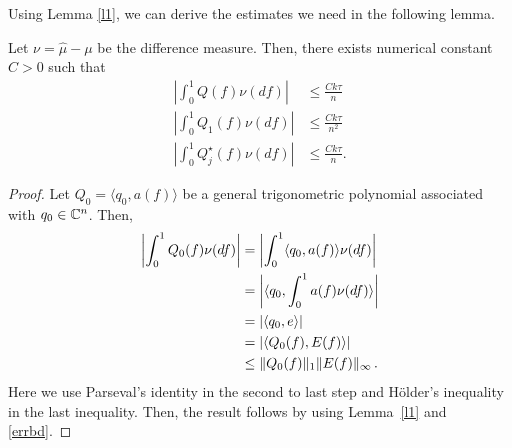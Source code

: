 Using Lemma \ref{l1}, we can derive the estimates we need in the following lemma.
\begin{lemma}
\label{l4}
Let $\nu = \hat{\mu} - \mu$ be the difference measure. Then, there exists numerical constant $C>0$ such that
\begin{align}
\label{qv}\left| \int_0^1 Q(f) \nu(df) \right| &\leq \frac{C k \tau}{n}\\
\label{q1v}\left| \int_0^1 Q_1(f) \nu(df) \right| &\leq \frac{C k \tau}{n^2}\\
\label{qjv} \left| \int_0^1 Q_j^\star(f) \nu(df) \right| & \leq \frac{Ck\tau}{n}.
\end{align}
\end{lemma}
\begin{proof}
Let $Q_0 = \langle q_0, a(f) \rangle $ be a general trigonometric polynomial associated with $q_0 \in \mathbb{C}^n$. Then,
\begin{align*}
\left|\int_0^1 Q_0(f) \nu(df) \right| 
& = \left|\int_0^1 \langle q_0 , a(f) \rangle  \nu(df) \right|\\
& = \left|\langle q_0,  \int_0^1  a(f)  \nu(df) \rangle\right|\\
& = \left|\langle q_0, e \rangle\right|\\
& = \left|\langle Q_0(f), E(f) \rangle\right|\\
& \leq \lVert Q_0(f)\rVert_1 \lVert E(f)\rVert_\infty\,.
\end{align*}
Here we use Parseval's identity in the second to last step and H\"{o}lder's inequality in the last inequality. Then, the result follows by using Lemma~\ref{l1} and \eqref{errbd}.
\end{proof}
% 

